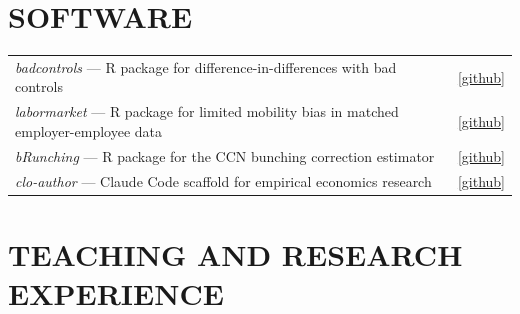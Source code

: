 \documentclass[11pt,letterpaper]{article}
\begin{document}
\section*{SOFTWARE}
\begin{tabularx}{\textwidth}{Xr}
    \textit{badcontrols} --- R package for difference-in-differences with bad controls & \href{https://github.com/hugosantanna/badcontrols}{[github]} \\
    \textit{labormarket} --- R package for limited mobility bias in matched employer-employee data & \href{https://github.com/hugosantanna/labormarket}{[github]} \\
    \textit{bRunching} --- R package for the CCN bunching correction estimator & \href{https://github.com/hugosantanna/bRunching}{[github]} \\
    \textit{clo-author} --- Claude Code scaffold for empirical economics research & \href{https://github.com/hugosantanna/clo-author}{[github]} \\
\end{tabularx}

\section*{TEACHING AND RESEARCH EXPERIENCE}
\end{document}
